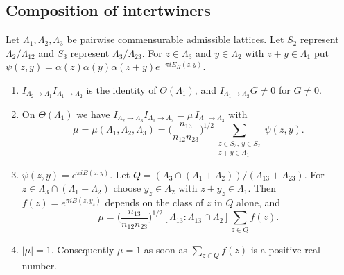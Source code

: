 \subsection{Composition of intertwiners}\label{sec:triples}

\begin{lemma}\label{tripleformula}
Let $\Lambda_1,\Lambda_2,\Lambda_3$ be pairwise commensurable admissible lattices. Let $S_2$ represent $\Lambda_2/\Lambda_{12}$ and $S_3$ represent $\Lambda_3/\Lambda_{23}$. For $z\in\Lambda_3$ and $y\in\Lambda_2$ with $z+y\in\Lambda_1$ put $\psi(z,y)=\alpha(z)\alpha(y)\alpha(z+y)e^{-\pi iE_H(z,y)}$.
\begin{enumerate}
\item[(i)] $I_{\Lambda_2\to\Lambda_1}I_{\Lambda_1\to\Lambda_2}$ is the identity of $\Theta(\Lambda_1)$, and $I_{\Lambda_1\to\Lambda_2}G\ne0$ for $G\ne0$.
\item[(ii)] On $\Theta(\Lambda_1)$ we have $I_{\Lambda_2\to\Lambda_3}I_{\Lambda_1\to\Lambda_2}=\mu\,I_{\Lambda_1\to\Lambda_3}$ with
\[
\mu=\mu(\Lambda_1,\Lambda_2,\Lambda_3)=\Big(\frac{n_{13}}{n_{12}n_{23}}\Big)^{1/2}\sum_{\substack{z\in S_3,\ y\in S_2\\z+y\in\Lambda_1}}\psi(z,y).
\]
\item[(iii)] $\psi(z,y)=e^{\pi iB(z,y)}$. Let $Q=(\Lambda_3\cap(\Lambda_1+\Lambda_2))/(\Lambda_{13}+\Lambda_{23})$. For $z\in\Lambda_3\cap(\Lambda_1+\Lambda_2)$ choose $y_z\in\Lambda_2$ with $z+y_z\in\Lambda_1$. Then $f(z)=e^{\pi iB(z,y_z)}$ depends on the class of $z$ in $Q$ alone, and
\[
\mu=\Big(\frac{n_{13}}{n_{12}n_{23}}\Big)^{1/2}[\Lambda_{13}:\Lambda_{13}\cap\Lambda_2]\sum_{z\in Q}f(z).
\]
\item[(iv)] $\lvert\mu\rvert=1$. Consequently $\mu=1$ as soon as $\sum_{z\in Q}f(z)$ is a positive real number.
\end{enumerate}
\end{lemma}

